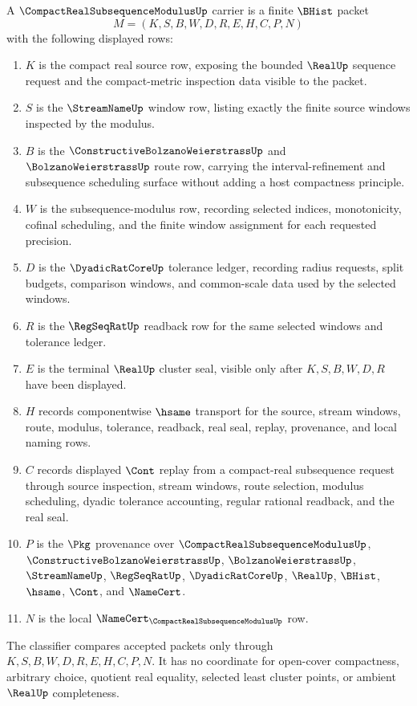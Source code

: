 \begin{definition}
\label{def:compact-real-subsequence-modulus-carrier}
A $\CompactRealSubsequenceModulusUp$ carrier is a finite $\BHist$ packet
$$
M=(K,S,B,W,D,R,E,H,C,P,N)
$$
with the following displayed rows:
\begin{enumerate}
\item $K$ is the compact real source row, exposing the bounded $\RealUp$ sequence request and the compact-metric inspection data visible to the packet.
\item $S$ is the $\StreamNameUp$ window row, listing exactly the finite source windows inspected by the modulus.
\item $B$ is the $\ConstructiveBolzanoWeierstrassUp$ and $\BolzanoWeierstrassUp$ route row, carrying the interval-refinement and subsequence scheduling surface without adding a host compactness principle.
\item $W$ is the subsequence-modulus row, recording selected indices, monotonicity, cofinal scheduling, and the finite window assignment for each requested precision.
\item $D$ is the $\DyadicRatCoreUp$ tolerance ledger, recording radius requests, split budgets, comparison windows, and common-scale data used by the selected windows.
\item $R$ is the $\RegSeqRatUp$ readback row for the same selected windows and tolerance ledger.
\item $E$ is the terminal $\RealUp$ cluster seal, visible only after $K,S,B,W,D,R$ have been displayed.
\item $H$ records componentwise $\hsame$ transport for the source, stream windows, route, modulus, tolerance, readback, real seal, replay, provenance, and local naming rows.
\item $C$ records displayed $\Cont$ replay from a compact-real subsequence request through source inspection, stream windows, route selection, modulus scheduling, dyadic tolerance accounting, regular rational readback, and the real seal.
\item $P$ is the $\Pkg$ provenance over $\CompactRealSubsequenceModulusUp$, $\ConstructiveBolzanoWeierstrassUp$, $\BolzanoWeierstrassUp$, $\StreamNameUp$, $\RegSeqRatUp$, $\DyadicRatCoreUp$, $\RealUp$, $\BHist$, $\hsame$, $\Cont$, and $\NameCert$.
\item $N$ is the local $\NameCert_{\CompactRealSubsequenceModulusUp}$ row.
\end{enumerate}
The classifier compares accepted packets only through $K,S,B,W,D,R,E,H,C,P,N$. It has no coordinate for open-cover compactness, arbitrary choice, quotient real equality, selected least cluster points, or ambient $\RealUp$ completeness.
\end{definition}

